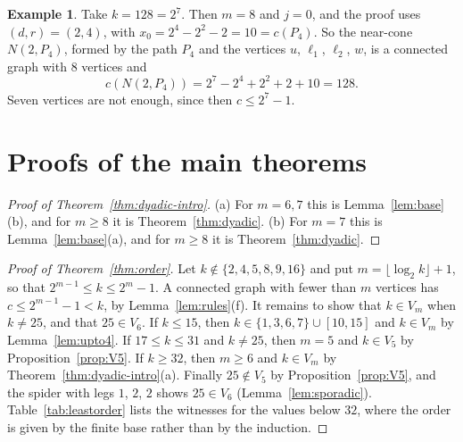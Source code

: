 \documentclass[11pt]{amsart}
\theoremstyle{definition}
\newtheorem{example}[theorem]{Example}
\theoremstyle{remark}
\begin{document}
\begin{example}\label{ex:128}
Take $k=128=2^7$. Then $m=8$ and $j=0$, and the proof uses $(d,r)=(2,4)$, with $x_0=2^4-2^2-2=10=c(P_4)$. So the near-cone $N(2,P_4)$, formed by the path $P_4$ and the vertices $u$, $\ell_1$, $\ell_2$, $w$, is a connected graph with $8$ vertices and
\[
c(N(2,P_4))=2^7-2^4+2^2+2+10=128.
\]
Seven vertices are not enough, since then $c\le2^7-1$.
\end{example}

\section{Proofs of the main theorems}\label{sec:proofs}

\begin{proof}[Proof of Theorem~\ref{thm:dyadic-intro}]
(a) For $m=6,7$ this is Lemma~\ref{lem:base}(b), and for $m\ge8$ it is Theorem~\ref{thm:dyadic}. (b) For $m=7$ this is Lemma~\ref{lem:base}(a), and for $m\ge8$ it is Theorem~\ref{thm:dyadic}.
\end{proof}

\begin{proof}[Proof of Theorem~\ref{thm:order}]
Let $k\notin\{2,4,5,8,9,16\}$ and put $m=\lfloor\log_2k\rfloor+1$, so that $2^{m-1}\le k\le2^m-1$. A connected graph with fewer than $m$ vertices has $c\le2^{m-1}-1<k$, by Lemma~\ref{lem:rules}(f). It remains to show that $k\in V_m$ when $k\ne25$, and that $25\in V_6$. If $k\le15$, then $k\in\{1,3,6,7\}\cup[10,15]$ and $k\in V_m$ by Lemma~\ref{lem:upto4}. If $17\le k\le31$ and $k\ne25$, then $m=5$ and $k\in V_5$ by Proposition~\ref{prop:V5}. If $k\ge32$, then $m\ge6$ and $k\in V_m$ by Theorem~\ref{thm:dyadic-intro}(a). Finally $25\notin V_5$ by Proposition~\ref{prop:V5}, and the spider with legs $1$, $2$, $2$ shows $25\in V_6$ (Lemma~\ref{lem:sporadic}). Table~\ref{tab:leastorder} lists the witnesses for the values below $32$, where the order is given by the finite base rather than by the induction.
\end{proof}
\end{document}
